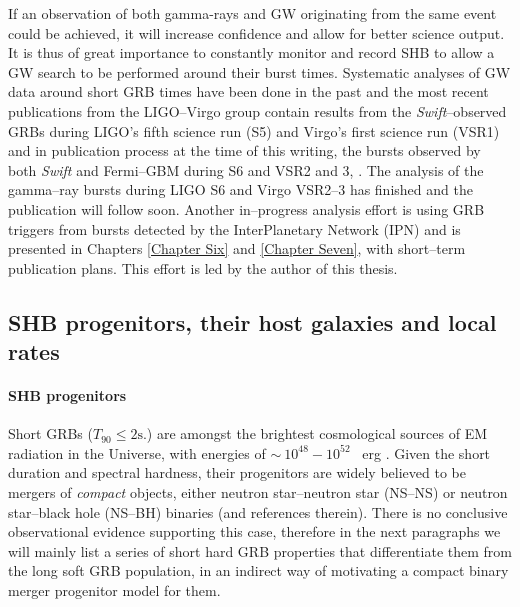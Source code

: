 If an observation of both gamma-rays and GW originating from the same event could be achieved, it will increase confidence and allow for better science output. It is thus of great importance to constantly monitor and record SHB to allow a GW search to be performed around their burst times. Systematic analyses of GW data around short GRB times have been done in the past and the most recent publications from the LIGO--Virgo group contain results from the \emph{Swift}--observed GRBs during LIGO's fifth science run (S5) and Virgo's first science run (VSR1) \cite{Abadie:2010uf, Collaboration:2009kk} and in publication process at the time of this writing, the bursts observed by both \emph{Swift} and Fermi--GBM during S6 and VSR2 and 3, \cite{lvc:s6grb}. The analysis of the gamma--ray bursts during LIGO S6 and Virgo VSR2--3 has finished and the publication will follow soon. Another in--progress analysis effort is using GRB triggers from bursts detected by the InterPlanetary Network (IPN) and is presented in Chapters \ref{Chapter Six} and \ref{Chapter Seven}, with short--term publication plans. This effort is led by the author of this thesis.

\subsection{SHB progenitors, their host galaxies and local rates}

\paragraph{SHB progenitors}
Short GRBs ($T_{90} \leq \mathrm{2s.}$) are amongst the brightest cosmological sources of EM radiation in the Universe, with energies of $\sim~10^{48}-10^{52}$ ~erg \cite{Nakar:2007,Berger:2010qx}. Given the short duration and spectral hardness, their progenitors are widely believed to be mergers of \emph{compact} objects, either neutron star--neutron star (NS--NS) or neutron star--black hole (NS--BH) binaries \cite{Paczynski:1986px, Nakar:2007, Belczynski:2006br, Troja:2007kt, Metzger:2011bv, Capozziello:2010sm, Berger:2010qx} (and references therein). There is no conclusive observational evidence supporting this case, therefore in the next paragraphs we will mainly list a series of short hard GRB properties that differentiate them from the long soft GRB population, in an indirect way of motivating a compact binary merger progenitor model for them.

